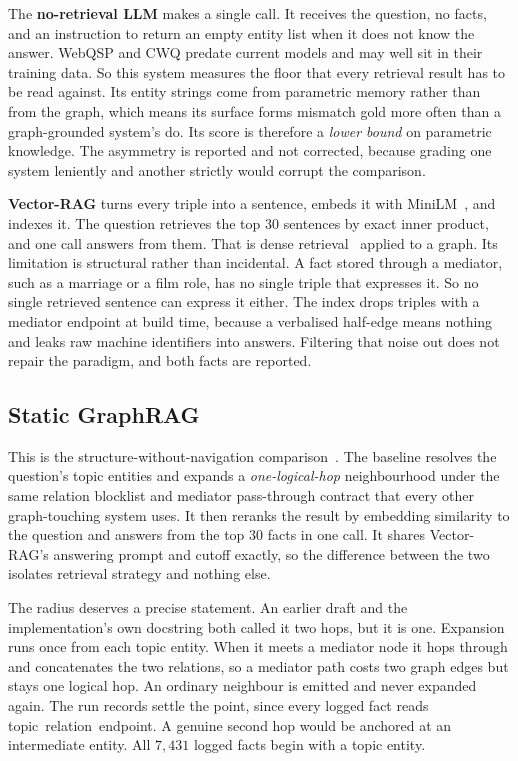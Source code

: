 The \textbf{no-retrieval LLM} makes a single call. It receives the question, no
facts, and an instruction to return an empty entity list when it does not know
the answer. WebQSP and CWQ predate current models and may well sit in their
training data. So this system measures the floor that every retrieval result has
to be read against. Its entity strings come from parametric memory rather than
from the graph, which means its surface forms mismatch gold more often than a
graph-grounded system's do. Its score is therefore a \emph{lower bound} on
parametric knowledge. The asymmetry is reported and not corrected, because
grading one system leniently and another strictly would corrupt the comparison.

\textbf{Vector-RAG} turns every triple into a sentence, embeds it with
MiniLM~\cite{reimers2019sentence}, and indexes it. The question retrieves the
top $30$ sentences by exact inner product, and one call answers from them. That
is dense retrieval~\cite{karpukhin2020dense} applied to a graph. Its limitation
is structural rather than incidental. A fact stored through a mediator, such as
a marriage or a film role, has no single triple that expresses it. So no single
retrieved sentence can express it either. The index drops triples with a
mediator endpoint at build time, because a verbalised half-edge means nothing
and leaks raw machine identifiers into answers. Filtering that noise out does
not repair the paradigm, and both facts are reported.

\subsection{Static GraphRAG}\label{sec:baseline-graphrag}

This is the structure-without-navigation comparison~\cite{edge2024local}. The
baseline resolves the question's topic entities and expands a
\emph{one-logical-hop} neighbourhood under the same relation blocklist and
mediator pass-through contract that every other graph-touching system uses. It
then reranks the result by embedding similarity to the question and answers from
the top $30$ facts in one call. It shares Vector-RAG's answering prompt and
cutoff exactly, so the difference between the two isolates retrieval strategy
and nothing else.

The radius deserves a precise statement. An earlier draft and the
implementation's own docstring both called it two hops, but it is one. Expansion
runs once from each topic entity. When it meets a mediator node it hops through
and concatenates the two relations, so a mediator path costs two graph edges but
stays one logical hop. An ordinary neighbour is emitted and never expanded
again. The run records settle the point, since every logged fact reads
\textsf{topic\ relation\ endpoint}. A genuine second hop would be anchored at an
intermediate entity. All $7{,}431$ logged facts begin with a topic entity.

